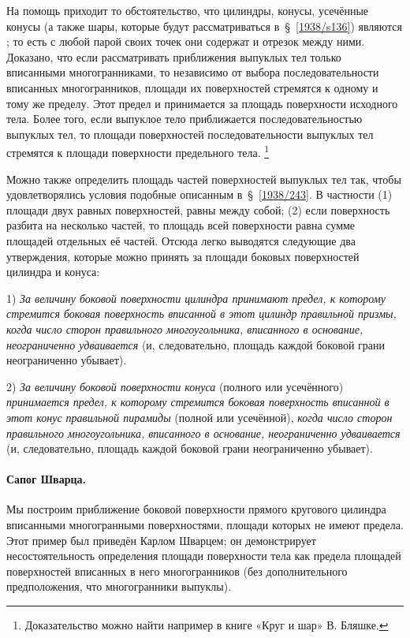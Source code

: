 На помощь приходит то обстоятельство, что цилиндры, конусы, усечённые конусы (а также шары, которые будут рассматриваться в~§~\ref{1938/s136}) являются ; то есть с любой парой своих точек они содержат и отрезок между ними.
Доказано, что если рассматривать приближения выпуклых тел только  вписанными многогранниками, то независимо от выбора последовательности вписанных многогранников, площади их поверхностей стремятся к одному и тому же пределу.
Этот предел и принимается за площадь поверхности исходного тела. 
Более того, если выпуклое тело приближается последовательностью выпуклых тел,
то площади поверхностей последовательности выпуклых тел стремятся к площади поверхности предельного тела.%
\footnote{Доказательство можно найти например в книге «Круг и шар» В. Бляшке.}

Можно также определить площадь частей поверхностей выпуклых тел так, чтобы удовлетворялись условия подобные описанным в~§~\ref{1938/243}.
В частности (1) площади двух равных поверхностей, равны между собой; (2) если поверхность разбита на несколько частей, то  площадь всей поверхности равна сумме площадей отдельных её частей.
Отсюда легко выводятся следующие два утверждения, которые можно принять за  площади боковых поверхностей цилиндра и конуса:

1) \emph{За величину боковой поверхности цилиндра принимают предел, к которому стремится боковая поверхность вписанной в этот цилиндр правильной призмы, когда число сторон правильного многоугольника, вписанного в основание, неограниченно удваивается} (и, следовательно, площадь каждой боковой грани неограниченно убывает).

2) \emph{За величину боковой поверхности конуса} (полного или усечённого) \emph{принимается предел, к которому стремится боковая поверхность вписанной в этот конус правильной пирамиды} (полной или усечённой), \emph{когда число сторон правильного многоугольника, вписанного в основание, неограниченно удваивается} (и, следовательно, площадь каждой боковой грани неограниченно убывает).

\paragraph{Сапог Шварца.}\label{fikhtengoltz/3-623b}
Мы построим приближение боковой поверхности прямого кругового цилиндра  вписанными многогранными поверхностями, площади которых не имеют предела.
Этот пример был приведён Карлом Шварцем; он демонстрирует несостоятельность определения площади поверхности тела как предела площадей поверхностей вписанных в него многогранников (без дополнительного предположения, что многогранники выпуклы).

